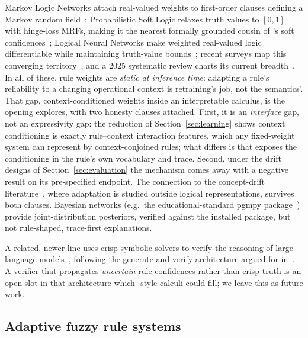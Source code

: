 Markov Logic Networks attach real-valued weights to first-order clauses
defining a Markov random field~\cite{richardson2006}; Probabilistic Soft
Logic relaxes truth values to $[0,1]$ with hinge-loss MRFs, making it
the nearest formally grounded cousin of \pla{}'s soft
confidences~\cite{bach2017}; Logical Neural Networks make weighted
real-valued logic differentiable while maintaining truth-value
bounds~\cite{riegel2020}; recent surveys map this converging
territory~\cite{marra2024,garcez2023}, and a 2025 systematic review
charts its current breadth~\cite{colelough2025}. In all of these, rule weights are
\emph{static at inference time}: adapting a rule's reliability to a
changing operational context is retraining's job, not the semantics'.
That gap, context-conditioned weights inside an interpretable
calculus, is the opening \pla{} explores, with two honesty clauses
attached. First, it is an \emph{interface} gap, not an expressivity
gap: the reduction of Section~\ref{sec:learning} shows context
conditioning is exactly rule--context interaction features, which any
fixed-weight system can represent by context-conjoined rules; what
differs is that \pla{} exposes the conditioning in the rule's own
vocabulary and trace. Second, under the drift designs of
Section~\ref{sec:evaluation} the mechanism comes away with a negative
result on its pre-specified endpoint. The connection to the concept-drift
literature~\cite{gama2014}, where adaptation is studied outside
logical representations, survives both clauses. Bayesian networks (e.g.\ the
educational-standard pgmpy package~\cite{ankan2015}) provide
joint-distribution posteriors, verified against the installed package,
but not rule-shaped, trace-first explanations.

A related, newer line uses crisp symbolic solvers to verify the
reasoning of large language models~\cite{pan2023,olausson2023,ye2023},
following the generate-and-verify architecture argued for
in~\cite{kambhampati2024}. A verifier that propagates \emph{uncertain}
rule confidences rather than crisp truth is an open slot in that
architecture which \pla{}-style calculi could fill; we leave this as
future work.

\subsection{Adaptive fuzzy rule systems}

